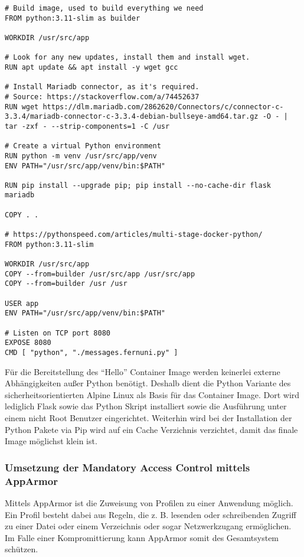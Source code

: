 \begin{verbatim}
# Build image, used to build everything we need
FROM python:3.11-slim as builder

WORKDIR /usr/src/app

# Look for any new updates, install them and install wget.
RUN apt update && apt install -y wget gcc

# Install Mariadb connector, as it's required.
# Source: https://stackoverflow.com/a/74452637
RUN wget https://dlm.mariadb.com/2862620/Connectors/c/connector-c-3.3.4/mariadb-connector-c-3.3.4-debian-bullseye-amd64.tar.gz -O - | tar -zxf - --strip-components=1 -C /usr

# Create a virtual Python environment
RUN python -m venv /usr/src/app/venv
ENV PATH="/usr/src/app/venv/bin:$PATH"

RUN pip install --upgrade pip; pip install --no-cache-dir flask mariadb

COPY . .

# https://pythonspeed.com/articles/multi-stage-docker-python/
FROM python:3.11-slim

WORKDIR /usr/src/app
COPY --from=builder /usr/src/app /usr/src/app
COPY --from=builder /usr /usr

USER app
ENV PATH="/usr/src/app/venv/bin:$PATH"

# Listen on TCP port 8080
EXPOSE 8080
CMD [ "python", "./messages.fernuni.py" ]
\end{verbatim}

Für die Bereitstellung des \enquote{Hello} Container Image werden keinerlei externe Abhängigkeiten außer Python benötigt. Deshalb dient die Python Variante des sicherheitsorientierten Alpine Linux als Basis für das Container Image. Dort wird lediglich Flask sowie das Python Skript installiert sowie die Ausführung unter einem nicht Root Benutzer eingerichtet. Weiterhin wird bei der Installation der Python Pakete via Pip wird auf ein Cache Verzichnis verzichtet, damit das finale Image möglichst klein ist.

\subsubsection{Umsetzung der Mandatory Access Control mittels AppArmor}\label{kap:installation_apparmor}

Mittels AppArmor ist die Zuweisung von Profilen zu einer Anwendung möglich. Ein Profil besteht dabei aus Regeln, die z. B. lesenden oder schreibenden Zugriff zu einer Datei oder einem Verzeichnis oder sogar Netzwerkzugang ermöglichen. Im Falle einer Kompromittierung kann AppArmor somit des Gesamtsystem schützen.

